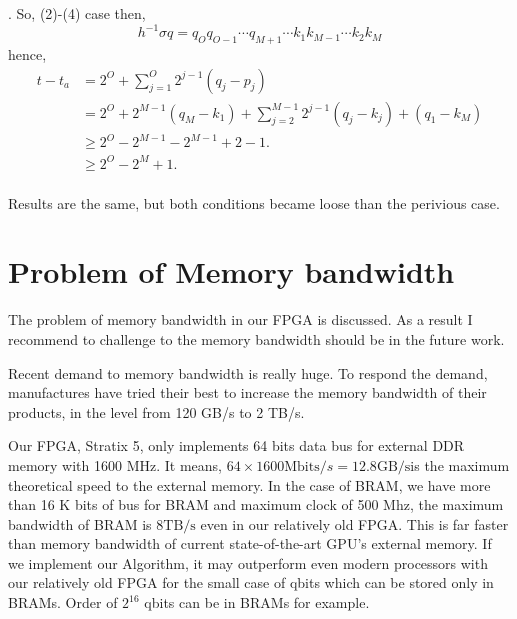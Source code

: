 \documentclass[a4paper]{article}
\newenvironment{XA}
  {\color[rgb]{0.4,0.0,0.1}.}
  {}
\begin{document}
\begin{XA}
So, (2)-(4) case then,
\[
h^{-1}\sigma q  = q_O q_{O-1}\cdots q_{M+1} \cdots k_1 k_{M-1}\cdots k_2 k_M
\]
hence, 
\begin{align*}
 t - t_a &= 2^O + \sum_{j=1}^{O} 2^{j-1}(q_j-p_j) \\
 &= 2^O + 2^{M-1}(q_M-k_1) + \sum_{j=2}^{M-1} 2^{j-1}(q_j-k_j) + (q_1-k_M)\\
 &\geq 2^O - 2^{M-1} - 2^{M-1} + 2 - 1.\\
 &\geq 2^O - 2^{M} + 1.\\
\end{align*}

Results are the same, but both conditions became loose than the perivious case. 
\end{XA}
\section{Problem of Memory bandwidth}
The problem of memory bandwidth in our FPGA is discussed. As a result I recommend to challenge to the memory bandwidth should be in the future work.

Recent demand to memory bandwidth is really huge. To respond the demand, manufactures have tried their best to increase the memory bandwidth of their products, in the level from 120 GB/s to 2 TB/s.

Our FPGA, Stratix 5, only implements 64 bits data bus for external DDR memory with 1600 MHz. It means, \(64\times 1600 \mathrm{Mbits}/s = 12.8 \mathrm{GB/s}\)is the maximum theoretical speed to the external memory. In the case of BRAM, we have more than 16 K bits of bus for BRAM and maximum clock of 500 Mhz, the maximum bandwidth of BRAM is \(8 \mathrm{TB/s}\) even in our relatively old FPGA. This is far faster than memory bandwidth of current state-of-the-art GPU's external memory. If we implement our Algorithm, it may outperform even modern processors with our relatively old FPGA for the small case of qbits which can be stored only in BRAMs. Order of \(2^{16}\) qbits can be in BRAMs for example.
\end{document}
